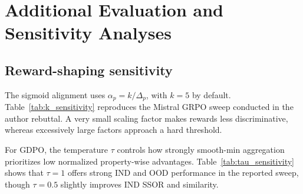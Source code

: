 \section{Additional Evaluation and Sensitivity Analyses}
\label{appendix:sensitivity}

\subsection{Reward-shaping sensitivity}
The sigmoid alignment uses $\alpha_p=k/\Delta_p$, with $k=5$ by default. Table~\ref{tab:k_sensitivity} reproduces the Mistral GRPO sweep conducted in the author rebuttal. A very small scaling factor makes rewards less discriminative, whereas excessively large factors approach a hard threshold.

\begin{table}[t]
\centering\small
\caption{Sigmoid scaling sensitivity on Mistral GRPO, from the author rebuttal.}
\label{tab:k_sensitivity}
\end{table}

For GDPO, the temperature $\tau$ controls how strongly smooth-min aggregation prioritizes low normalized property-wise advantages. Table~\ref{tab:tau_sensitivity} shows that $\tau=1$ offers strong IND and OOD performance in the reported sweep, though $\tau=0.5$ slightly improves IND SSOR and similarity.

